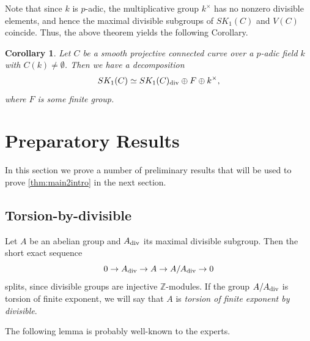 \documentclass[12pt]{amsart}
\newtheorem{cor}[cor]{Corollary}
\theoremstyle{remark}
\newcommand{\Z}{{\mathbb Z}}
\renewcommand{\1}{{\mathbb{S}}}
\newcommand{\<}{\langle}
\renewcommand{\>}{\rangle}
\newcommand{\dv}{{\rm div}}
\begin{document}
Note that since $k$ is $p$-adic, the multiplicative group $k^\times$ has no nonzero divisible elements, and hence the maximal divisible subgroups of $SK_1(C)$ and $V(C)$ coincide. Thus, the above theorem yields the following Corollary.

\begin{cor}\label{cor:SK1structure}
    Let $C$ be a smooth projective connected curve over a $p$-adic field $k$ with $C(k)\neq\emptyset$. Then we have a decomposition 
    \[SK_1(C)\simeq SK_1(C)_{\dv}\oplus F\oplus k^\times,\] where $F$ is some finite group. 
\end{cor}






\vspace{3pt}	

\section{Preparatory Results}\label{sec:prelims}
In this section we prove a number of preliminary results that will be used to prove \autoref{thm:main2intro} in the next section. 



\subsection{Torsion-by-divisible}
Let $A$ be an abelian group and $A_{\dv}$ its maximal divisible subgroup. Then the short exact sequence 
\[0\to A_{\dv}\to A\to A/A_{\dv}\to 0\] splits, since divisible groups are injective $\Z$-modules. If the group $A/A_{\dv}$ is torsion of finite exponent, we will say that $A$ is \textit{torsion of finite exponent by divisible}. 

The following lemma is probably well-known to the experts.   
\end{document}
